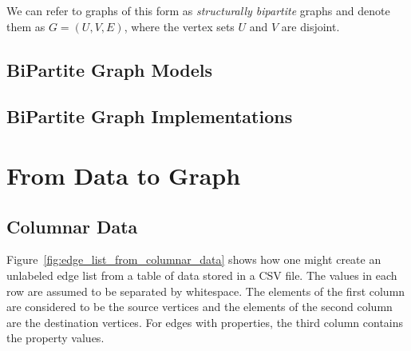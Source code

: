 We can refer to graphs of this form as \emph{structurally bipartite} graphs and
denote them as $G = (U, V, E)$, where the vertex sets $U$ and $V$ are disjoint.

\subsection{BiPartite Graph Models}

\subsection{BiPartite Graph Implementations}



\section{From Data to Graph}

\subsection{Columnar Data}

Figure~\ref{fig:edge_list_from_columnar_data}
shows how one might create an unlabeled edge list from a table of data stored in a CSV file.
The values in each row are assumed to be separated by whitespace.
The elements of the first column are considered to be the source vertices and the elements of
the second column are the destination vertices. For edges with properties, the third column
contains the property values.

